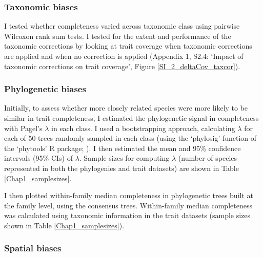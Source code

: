 \subsubsection{Taxonomic biases}
I tested whether completeness varied across taxonomic class using pairwise Wilcoxon rank sum tests. I tested for the extent and performance of the taxonomic corrections by looking at trait coverage when taxonomic corrections are applied and when no correction is applied (Appendix 1, S2.4: `Impact of taxonomic corrections on trait coverage', Figure \ref{SI_2_deltaCov_taxcor}).

\subsubsection{Phylogenetic biases}
Initially, to assess whether more closely related species were more likely to be similar in trait completeness, I estimated the phylogenetic signal in completeness with Pagel’s $\lambda$ \citep{Pagel1999} in each class. I used a bootstrapping approach, calculating $\lambda$ for each of 50 trees randomly sampled in each class (using the `phylosig' function of the `phytools' R package; \cite{Revell2012}). I then estimated the mean and 95\% confidence intervals (95\% CIs) of $\lambda$. Sample sizes for computing $\lambda$ (number of species represented in both the phylogenies and trait datasets) are shown in Table \ref{Chap1_samplesizes}.

I then plotted within-family median completeness in phylogenetic trees built at the family level, using the consensus trees. Within-family median completeness was calculated using taxonomic information in the trait datasets (sample sizes shown in Table \ref{Chap1_samplesizes}).

\subsubsection{Spatial biases}

